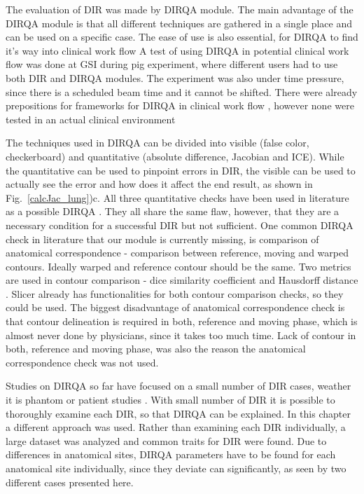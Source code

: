 \documentclass[type=dr, dr=rernat, accentcolor=tud7b,colorbacktitle, bigchapter, openright, twoside, 12pt ]{tudthesis}
\begin{document}
The evaluation of DIR was made by DIRQA module. The main advantage of the DIRQA module is that all different techniques are gathered in a single place and can be used on a specific case. The ease of use is also essential, for DIRQA to find it's way into clinical work flow
A test of using DIRQA in potential clinical work flow was done at GSI during pig experiment, where different users had to use both DIR and DIRQA modules. The experiment was also under time pressure, since there is
a scheduled beam time and it cannot be shifted. There were already prepositions for frameworks for DIRQA in clinical work flow \cite{Varadhan2013}, however none were tested in an actual clinical environment

The techniques used in DIRQA can be divided into visible (false color, checkerboard) and quantitative (absolute difference, Jacobian and ICE). While the quantitative can be used to pinpoint errors in DIR, the visible can be used to actually see the error and how does it affect the
end result, as shown in Fig.~\ref{calcJac_lung})c. All three quantitative checks have been used in literature as a possible DIRQA \cite{Varadhan2013, Leow2007, Christensen2001, Bender2009}. They all share the same flaw, however, that they are a necessary condition for a successful
DIR but not sufficient. One common DIRQA check in literature that our module is currently missing, is comparison of anatomical correspondence - comparison between reference, moving and warped contours. Ideally warped and reference contour should be the same. Two metrics are used in contour comparison -
dice similarity coefficient \cite{Varadhan2013} and Hausdorff distance \cite{Huttenlocher1993}. Slicer already has functionalities for both contour comparison checks, so they could be used. The biggest disadvantage of anatomical correspondence check is that contour delineation is required in both, reference and moving phase, which is almost never done by physicians, since it takes too much time. Lack of contour in both, reference and moving phase, was also the reason the anatomical correspondence check was not used.

Studies on DIRQA so far have focused on a small number of DIR cases, weather it is phantom \cite{Mutic2001,Moore2004} or patient studies \cite{Wu2008, Varadhan2013}. With small number of DIR it is possible to thoroughly examine each DIR, so that DIRQA can be explained. In this chapter a different approach was
used. Rather than examining each DIR individually, a large dataset was analyzed and common traits for DIR were found. Due to differences in anatomical sites, DIRQA parameters have to be found for each anatomical site individually, since they
deviate can significantly, as seen by two different cases presented here. 
\end{document}

